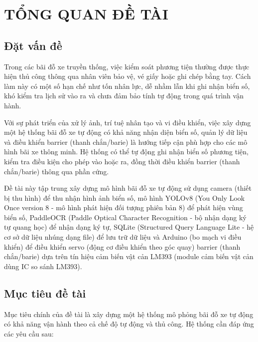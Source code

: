 \documentclass[a4paper,14pt]{extreport}
\begin{document}
\chapter{TỔNG QUAN ĐỀ TÀI}

\section{Đặt vấn đề}

Trong các bãi đỗ xe truyền thống, việc kiểm soát phương tiện thường được thực hiện thủ công thông qua nhân viên bảo vệ, vé giấy hoặc ghi chép bằng tay. Cách làm này có một số hạn chế như tốn nhân lực, dễ nhầm lẫn khi ghi nhận biển số, khó kiểm tra lịch sử vào ra và chưa đảm bảo tính tự động trong quá trình vận hành.

Với sự phát triển của xử lý ảnh, trí tuệ nhân tạo và vi điều khiển, việc xây dựng một hệ thống bãi đỗ xe tự động có khả năng nhận diện biển số, quản lý dữ liệu và điều khiển barrier (thanh chắn/barie) là hướng tiếp cận phù hợp cho các mô hình bãi xe thông minh. Hệ thống có thể tự động ghi nhận biển số phương tiện, kiểm tra điều kiện cho phép vào hoặc ra, đồng thời điều khiển barrier (thanh chắn/barie) thông qua phần cứng.

Đề tài này tập trung xây dựng mô hình bãi đỗ xe tự động sử dụng camera (thiết bị thu hình) để thu nhận hình ảnh biển số, mô hình YOLOv8 (You Only Look Once version 8 - mô hình phát hiện đối tượng phiên bản 8) để phát hiện vùng biển số, PaddleOCR (Paddle Optical Character Recognition - bộ nhận dạng ký tự quang học) để nhận dạng ký tự, SQLite (Structured Query Language Lite - hệ cơ sở dữ liệu nhúng dạng file) để lưu trữ dữ liệu và Arduino (bo mạch vi điều khiển) để điều khiển servo (động cơ điều khiển theo góc quay) barrier (thanh chắn/barie) dựa trên tín hiệu cảm biến vật cản LM393 (module cảm biến vật cản dùng IC so sánh LM393).

\section{Mục tiêu đề tài}

Mục tiêu chính của đề tài là xây dựng một hệ thống mô phỏng bãi đỗ xe tự động có khả năng vận hành theo cả chế độ tự động và thủ công. Hệ thống cần đáp ứng các yêu cầu sau:
\end{document}
